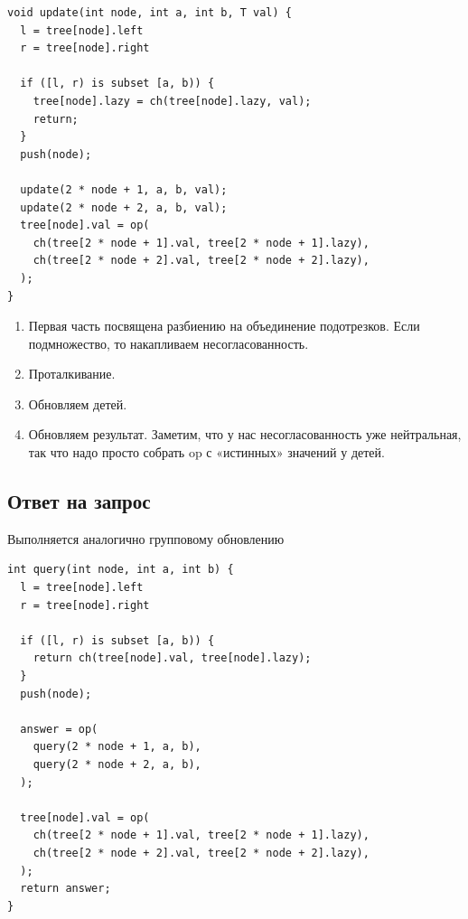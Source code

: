 \begin{lstlisting}
void update(int node, int a, int b, T val) {
  l = tree[node].left
  r = tree[node].right

  if ([l, r) is subset [a, b)) {
    tree[node].lazy = ch(tree[node].lazy, val);
    return;
  }
  push(node);

  update(2 * node + 1, a, b, val);
  update(2 * node + 2, a, b, val);
  tree[node].val = op(
    ch(tree[2 * node + 1].val, tree[2 * node + 1].lazy),
    ch(tree[2 * node + 2].val, tree[2 * node + 2].lazy),
  );
}
\end{lstlisting}

\Alg
\begin{enumerate}
    \item Первая часть посвящена разбиению на объединение подотрезков. Если подмножество, то накапливаем несогласованность.
    \item Проталкивание.
    \item Обновляем детей.
    \item Обновляем результат. Заметим, что у нас несогласованность уже нейтральная, так что надо просто собрать op с «истинных» значений у детей.
\end{enumerate}

\subsection{Ответ на запрос}

Выполняется аналогично групповому обновлению

\begin{lstlisting}
int query(int node, int a, int b) {
  l = tree[node].left
  r = tree[node].right

  if ([l, r) is subset [a, b)) {
    return ch(tree[node].val, tree[node].lazy);
  }
  push(node);

  answer = op(
    query(2 * node + 1, a, b),
    query(2 * node + 2, a, b),
  );

  tree[node].val = op(
    ch(tree[2 * node + 1].val, tree[2 * node + 1].lazy),
    ch(tree[2 * node + 2].val, tree[2 * node + 2].lazy),
  );
  return answer;
}
\end{lstlisting}

\pagebreak